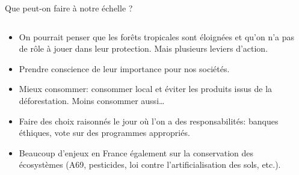 \documentclass[10pt,table,dvipsnames,compress]{beamer}
\begin{document}
\begin{frame}[label={sec:org05f8e72}]{Que peut-on faire à notre échelle ?}
\begin{columns}
\begin{column}{0.7\columnwidth}
\begin{itemize}
\item On pourrait penser que les forêts tropicales sont éloignées et qu'on n'a pas de rôle à jouer dans leur protection. Mais plusieurs leviers d'action.
\item Prendre conscience de leur importance pour nos sociétés.
\item Mieux consommer: consommer local et éviter les produits issus de la déforestation. Moins consommer aussi\ldots{}
\item Faire des choix raisonnés le jour où l'on a des responsabilités: banques éthiques, vote sur des programmes appropriés.
\item Beaucoup d'enjeux en France également sur la conservation des écosystèmes (A69, pesticides, loi contre l'artificialisation des sols, etc.).
\end{itemize}
\end{column}
\begin{column}{0.3\columnwidth}
\begin{center}

\end{center}
\end{column}
\end{columns}
\end{frame}
\end{document}
